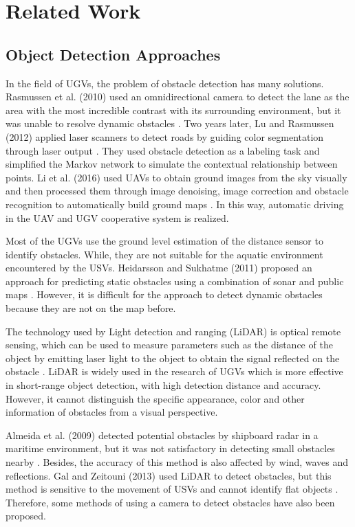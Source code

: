\documentclass[journal,article,submit,moreauthors,pdftex]{Definitions/mdpi}
\begin{document}
 \section{Related Work}


\subsection{Object Detection Approaches}

In the field of UGVs, the problem of obstacle detection has many solutions. Rasmussen et al. (2010) used an omnidirectional camera to detect the lane as the area with the most incredible contrast with its surrounding environment, but it was unable to resolve dynamic obstacles \cite{5650189}. Two years later, Lu and Rasmussen (2012) applied laser scanners to detect roads by guiding color segmentation through laser output \cite{6386039}. They used obstacle detection as a labeling task and simplified the Markov network to simulate the contextual relationship between points. Li et al. (2016) used UAVs to obtain ground images from the sky visually and then processed them through image denoising, image correction and obstacle recognition to automatically build ground maps  \cite{li2016hybrid}. In this way, automatic driving in the UAV and UGV cooperative system is realized.

Most of the UGVs use the ground level estimation of the distance sensor to identify obstacles. While, they are not suitable for the aquatic environment encountered by the USVs. Heidarsson and Sukhatme (2011) proposed an approach for predicting static obstacles using a combination of sonar and public maps \cite{5980509}. However, it is difficult for the approach to detect dynamic obstacles because they are not on the map before.

The technology used by Light detection and ranging (LiDAR) is optical remote sensing, which can be used to measure parameters such as the distance of the object by emitting laser light to the object to obtain the signal reflected on the obstacle \cite {larson2011lidar}. LiDAR is widely used in the research of UGVs which is more effective in short-range object detection, with high detection distance and accuracy. However, it cannot distinguish the specific appearance, color and other information of obstacles from a visual perspective. 

Almeida et al. (2009) detected potential obstacles by shipboard radar in a maritime environment, but it was not satisfactory in detecting small obstacles nearby \cite{5278238}. Besides, the accuracy of this method is also affected by wind, waves and reflections. Gal and Zeitouni (2013) used LiDAR to detect obstacles, but this method is sensitive to the movement of USVs and cannot identify flat objects \cite{sauze_tracking_2013}. Therefore, some methods of using a camera to detect obstacles have also been proposed. 
\end{document}
